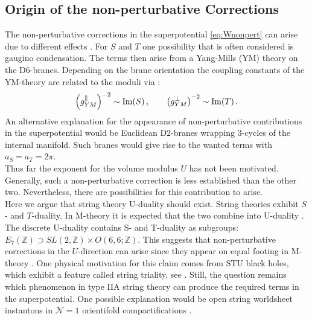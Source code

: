 \documentclass[a4paper,12pt]{report}
\newcommand{\be}{\begin{equation}}
\newcommand{\ee}{\end{equation}}
\def\rmim{{\rm Im}}
\begin{document}
\subsection{Origin of the non-perturbative Corrections}
The non-perturbative corrections in the superpotential \ref{eq:Wnonpert} can arise due to different effects \cite{Palti:2008mg}. For $S$ and $T$ one possibility that is often considered is gaugino condensation. The terms then arise from a Yang-Mills (YM) theory on the D6-branes. Depending on the brane orientation the coupling constants of the YM-theory are related to the moduli via \cite{Danielsson:2013rza}:
\be
\left(g_{YM}^\parallel \right)^{-2} \sim \rmim (S)\,, \qquad \left(g_{YM}^\perp \right)^{-2} \sim \rmim (T)\,.
\ee
An alternative explanation for the appearance of non-perturbative contributions in the superpotential would be Euclidean D2-branes wrapping 3-cycles of the internal manifold. Such branes would give rise to the wanted terms with $a_S =a_T= 2\pi$.\\
Thus far the exponent for the volume modulus $U$ has not been motivated. Generally, such a non-perturbative correction is less established than the other two. Nevertheless, there are possibilities for this contribution to arise.\\
Here we argue that string theory U-duality should exist. String theories exhibit $S$- and $T$-duality. In M-theory it is expected that the two combine into U-duality \cite{Hull:1994ys,Schwarz:1996bh}. The discrete U-duality  contains S- and T-duality as subgroups: $E_7(\mathbb{Z}) \supset SL(2,\mathbb{Z}) \times O(6,6;\mathbb{Z})$. This suggests that non-perturbative corrections in the $U$-direction can arise since they appear on equal footing in M-theory \cite{Acharya:2007rc}. One physical motivation for this claim comes from STU black holes, which exhibit a feature called string triality, see \cite{Behrndt:1996hu}. Still, the question remains which phenomenon in type IIA string theory can produce the required terms in the superpotential. One possible explanation would be open  string worldsheet instantons in $\mathcal{N} = 1$ orientifold compactifications \cite{Kachru:2000ih,Blumenhagen:2009qh}.\\
\end{document}

